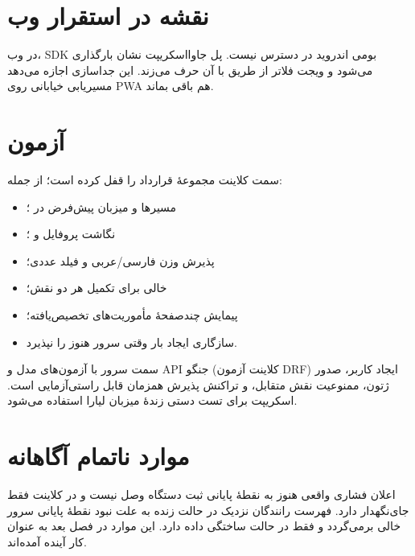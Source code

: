 \section{نقشه در استقرار وب}

در وب، \textenglish{SDK} بومی اندروید در دسترس نیست. پل جاوااسکریپت نشان بارگذاری می‌شود و ویجت فلاتر از طریق  با آن حرف می‌زند. این جداسازی اجازه می‌دهد مسیریابی خیابانی روی \textenglish{PWA} هم باقی بماند.

\section{آزمون}

سمت کلاینت مجموعهٔ  قرارداد را قفل کرده است؛ از جمله:

\begin{itemize}
  \item مسیرها و میزبان پیش‌فرض در ؛
  \item نگاشت پروفایل  و ؛
  \item پذیرش وزن فارسی/عربی و فیلد عددی؛
  \item {} خالی برای تکمیل هر دو نقش؛
  \item پیمایش چندصفحهٔ مأموریت‌های تخصیص‌یافته؛
  \item سازگاری ایجاد بار وقتی سرور هنوز  را نپذیرد.
\end{itemize}

سمت سرور با آزمون‌های مدل و \textenglish{API} جنگو (کلاینت آزمون \textenglish{DRF}) ایجاد کاربر، صدور ژتون، ممنوعیت نقش متقابل، و تراکنش پذیرش همزمان قابل راستی‌آزمایی است. اسکریپت  برای تست دستی زندهٔ میزبان لیارا استفاده می‌شود.

\section{موارد ناتمام آگاهانه}

اعلان فشاری واقعی هنوز به نقطهٔ پایانی ثبت دستگاه وصل نیست و در کلاینت فقط جای‌نگهدار دارد. فهرست رانندگان نزدیک در حالت زنده به علت نبود نقطهٔ پایانی سرور خالی برمی‌گردد و فقط در حالت ساختگی داده دارد. این موارد در فصل بعد به عنوان کار آینده آمده‌اند.
